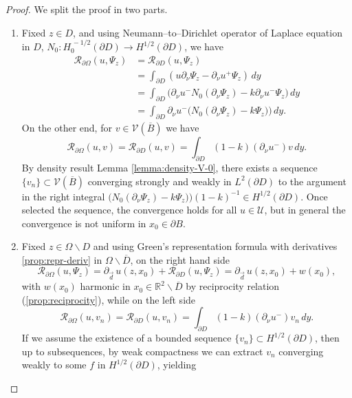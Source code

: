 \documentclass[10pt, a4paper, twoside, openright]{book}
\theoremstyle{definition}
\theoremstyle{plain}
\theoremstyle{plain}
\theoremstyle{plain}
\theoremstyle{plain}
\theoremstyle{plain}
\theoremstyle{plain}
\theoremstyle{plain}
\theoremstyle{plain}
\begin{document}
\begin{proof}
We split the proof in two parts.
 \begin{enumerate}
  \item Fixed $z \in D$, and using Neumann--to--Dirichlet operator of Laplace equation in $D$, ${N_0}:H^{\,-1/2}_0(\partial D)\to H^{1/2}(\partial D)$,
    we have
    \begin{align}
    \mathcal{R}_{\partial \Omega}(u,\Psi_z) &= \mathcal{R}_{\partial D}(u,\Psi_z) \\
    &= \int_{\partial D}(u\partial_\nu\Psi_z - \partial_\nu u^+ \Psi_z) \,dy\\
    &= \int_{\partial D}\bigl(\partial_\nu u^- {N_0}(\partial_\nu\Psi_z) - k \partial_\nu u^- \Psi_z\bigr) \,dy \\
    &= \int_{\partial D}\partial_\nu u^-\Big( {N_0}(\partial_\nu\Psi_z) - k \Psi_z)\Big) \,dy.
    \end{align}
  On the other end, for $v\in\mathcal{V}(\overline{B})$ we have
  \begin{equation}
   \mathcal{R}_{\partial \Omega}(u,v) = \mathcal{R}_{\partial D}(u,v) = \int_{\partial D}(1-k)(\partial_\nu u^- )v\,dy.
  \end{equation}
  By density result Lemma \ref{lemma:density-V-0}, there exists a sequence $\{v_n\}\subset \mathcal{V}(\overline{B})$ converging strongly and weakly in $L^2(\partial D)$ to the argument in the right integral $\bigl( {N_0}(\partial_\nu\Psi_z) - k \Psi_z)\bigr)(1-k)^{-1}\in H^{1/2}(\partial D)$.
  Once selected the sequence, the convergence holds for all $u\in\mathcal{U}$, but in general the convergence is not uniform in $x_0\in \partial B$.
  \item Fixed $z \in \Omega\backslash D$ and using Green's representation formula with derivatives \eqref{prop:repr-deriv} in $\Omega\backslash\overline{D}$, on the right hand side
  \begin{equation}
   \mathcal{R}_{\partial \Omega}(u,\Psi_z) = \partial_{\vec{d}}\,u(z,x_0) + \mathcal{R}_{\partial D}(u,\Psi_z) = \partial_{\vec{d}}\,u(z,x_0) + w(x_0),
  \end{equation}
  with $w(x_0)$ harmonic in $x_0 \in \mathbb{R}^2\backslash \overline{D}$ by reciprocity relation (\ref{prop:reciprocity}), while on the left side
  \begin{equation}
   \mathcal{R}_{\partial \Omega}(u,v_n) = \mathcal{R}_{\partial D}(u,v_n) = \int_{\partial D}(1-k)(\partial_\nu u^- )v_n\,dy.
  \end{equation}
  If we assume the existence of a bounded sequence $\{v_n\} \subset H^{1/2}(\partial D)$, then up to subsequences, by weak compactness we can extract $v_n$ converging weakly to some $f$ in $H^{1/2}(\partial D)$, yielding

\end{enumerate}
\end{proof}
\end{document}
